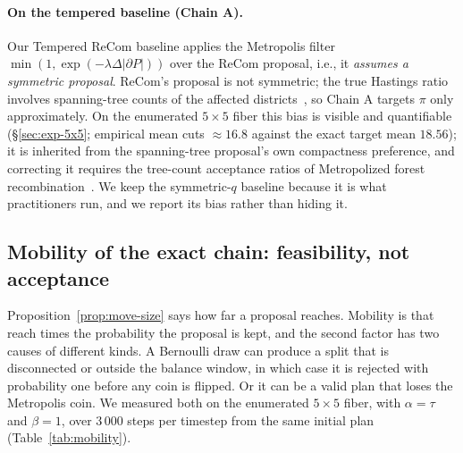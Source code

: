 \documentclass[11pt]{article}
\begin{document}
\paragraph{On the tempered baseline (Chain A).} Our Tempered ReCom
baseline applies the Metropolis filter
$\min(1, \exp(-\lambda \Delta|\partial P|))$ over the ReCom proposal,
i.e., it \emph{assumes a symmetric proposal}. ReCom's proposal is not
symmetric; the true Hastings ratio involves spanning-tree counts of
the affected districts~\cite{autry2023metropolized,cannon2022spanning}, so Chain A targets $\pi$ only approximately. On the enumerated
$5 \times 5$ fiber this bias is visible and quantifiable
(\S\ref{sec:exp-5x5}; empirical mean cuts $\approx 16.8$ against the
exact target mean $18.56$); it is inherited from the spanning-tree
proposal's own compactness preference, and correcting it requires the
tree-count acceptance ratios of Metropolized forest
recombination~\cite{autry2023metropolized}. We keep the symmetric-$q$
baseline because it is what practitioners run, and we report its bias
rather than hiding it.

\subsection{Mobility of the exact chain: feasibility, not acceptance}\label{sec:mobility}

Proposition~\ref{prop:move-size} says how far a proposal reaches.
Mobility is that reach times the probability the proposal is kept,
and the second factor has two causes of different kinds. A Bernoulli
draw can produce a split that is disconnected or outside the balance
window, in which case it is rejected with probability one before any
coin is flipped. Or it can be a valid plan that loses the Metropolis
coin. We measured both on the enumerated $5 \times 5$ fiber, with
$\alpha = \tau$ and $\beta = 1$, over 3\,000 steps per timestep from
the same initial plan (Table~\ref{tab:mobility}).
\end{document}
